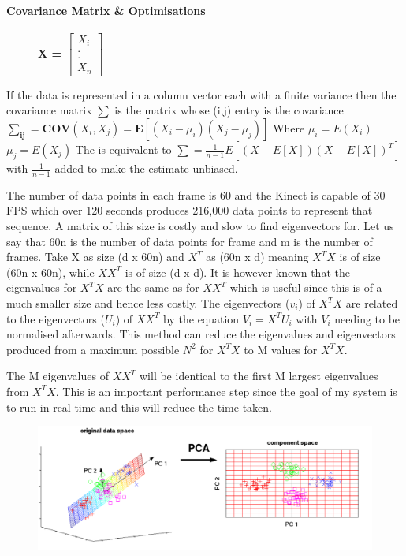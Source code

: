 \paragraph{Covariance Matrix \& Optimisations }
\begin{figure}
\vspace{-15pt}
\hspace{15pt}
\bf{X = } $\begin{bmatrix} X_i\\.\\.\\X_n \end{bmatrix}$\newline
\end{figure}
If the data is represented in a column vector each with a finite variance then the covariance matrix $\mathbf{\sum}$ is the matrix whose (i,j) entry is the covariance
$\mathbf{\sum_{ij}} = \mathbf{COV}(X_i,X_j) = \mathbf{E}[(X_i - \mu_i )(X_j - \mu_j )]$    Where $\mu_i = E(X_i)$  $\mu_j = E(X_j)$\newline
The is equivalent to $\mathbf{\sum} = \frac{1} {n-1} E[(X-E[X])(X-E[X])^T]$ with $\frac{1} {n-1}$ added to make the estimate unbiased.

The number of data points in each frame is 60 and the Kinect is capable of 30 FPS which over 120 seconds produces 216,000 data points to represent that sequence. A matrix of this size is costly and slow to find eigenvectors for. Let us say that 60n is the number of data points for frame and m is the number of frames. Take X as size (d x 60n) and $X^T$ as (60n x d) meaning $X^TX$ is of size (60n x 60n), while $XX^T$ is of size (d x d). It is however known that the eigenvalues for $X^TX$ are the same as for $XX^T$ which is useful since this is of a much smaller size and hence less costly.\cite{fastPCA}
The eigenvectors ($v_i$) of $X^TX$ are related to the eigenvectors ($U_i$) of $XX^T$ by the equation $V_i = X^TU_i$ with $V_i$ needing to be normalised afterwards. This method can reduce the eigenvalues and eigenvectors produced from a maximum possible $N^2$ for $X^TX$ to M values for $X^TX$.

The M eigenvalues of $XX^T$ will be identical to the first M largest eigenvalues from $X^TX$. This is an important performance step since the goal of my system is to run in real time and this will reduce the time taken.

\begin{figure}[h]
    \centering
    \includegraphics[height=0.25\textheight]{fig03/PCA.pdf}
    \label{fig:kinect}
\end{figure}


